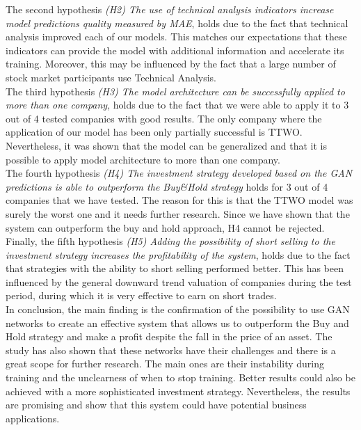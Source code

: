 \documentclass[11pt]{article} %
\begin{document}
The second hypothesis\textit{ (H2) The use of technical analysis indicators increase model predictions quality measured by MAE}, holds due to the fact that technical analysis improved each of our models. This matches our expectations that these indicators can provide the model with additional information and accelerate its training. Moreover, this may be influenced by the fact that a large number of stock market participants use Technical Analysis.\\

The third hypothesis\textit{ (H3) The model architecture can be successfully applied to more than one company}, holds due to the fact that we were able to apply it to 3 out of 4 tested companies with good results. The only company where the application of our model has been only partially successful is TTWO. Nevertheless, it was shown that the model can be generalized and that it is possible to apply model architecture to more than one company.\\

The fourth hypothesis\textit{ (H4) The investment strategy developed based on the GAN predictions is able to outperform the Buy\&Hold strategy} holds for 3 out of 4 companies that we have tested. The reason for this is that the TTWO model was surely the worst one and it needs further research. Since we have shown that the system can outperform the buy and hold approach, H4 cannot be rejected.\\

Finally, the fifth hypothesis\textit{ (H5) Adding the possibility of short selling to the investment strategy increases the profitability of the system}, holds due to the fact that strategies with the ability to short selling performed better.  This has been influenced by the general downward trend valuation of companies during the test period, during which it is very effective to earn on short trades.\\

In conclusion, the main finding is the confirmation of the possibility to use GAN networks to create an effective system that allows us to outperform the Buy and Hold strategy and make a profit despite the fall in the price of an asset. The study has also shown that these networks have their challenges and there is a great scope for further research. The main ones are their instability during training and the unclearness of when to stop training.  Better results could also be achieved with a more sophisticated investment strategy. Nevertheless, the results are promising and show that this system could have potential business applications.
\end{document}
